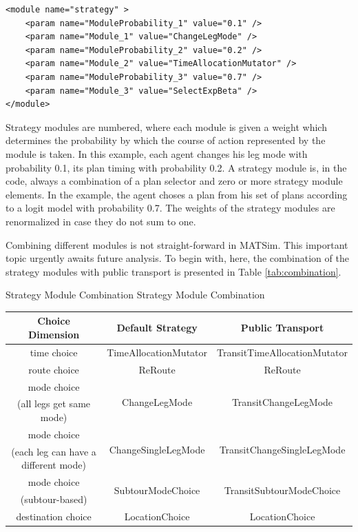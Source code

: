 \begin{lstlisting}
<module name="strategy" >
    <param name="ModuleProbability_1" value="0.1" />
    <param name="Module_1" value="ChangeLegMode" />
    <param name="ModuleProbability_2" value="0.2" />
    <param name="Module_2" value="TimeAllocationMutator" />
    <param name="ModuleProbability_3" value="0.7" />
    <param name="Module_3" value="SelectExpBeta" />
</module>
\end{lstlisting}

Strategy modules are numbered, where each module is given a weight which determines the probability by which the course of action represented by the module is taken. In this example, each agent changes his leg mode with probability 0.1, its plan timing with probability 0.2. A strategy module is, in the code, always a combination of a plan selector and zero or more strategy module elements. In the example, the agent choses a plan from his set of plans according to a logit model with probability 0.7. The weights of the strategy modules are renormalized in case they do not sum to one.

Combining different modules is not straight-forward in MATSim. This important topic urgently awaits future analysis. To begin with, here, the combination of the strategy modules with public transport is presented in Table \ref{tab:combination}.

\createtable%
{Strategy Module Combination}%
{Strategy Module Combination}%
{\label{tab:combination}}%
{%
  \begin{tabular}[c]{|c|c|c|}
   \hline
\textbf{Choice Dimension}	& \textbf{Default Strategy} & \textbf{Public Transport}\\
\hline
time choice & TimeAllocationMutator &  TransitTimeAllocationMutator\\
\hline
route choice & ReRoute & ReRoute \\
\hline
mode choice & \multirow{2}{*}{ChangeLegMode} & \multirow{2}{*}{TransitChangeLegMode} \\
(all legs get same mode) &  &  \\
\hline
mode choice & \multirow{2}{*}{ChangeSingleLegMode} & \multirow{2}{*}{TransitChangeSingleLegMode} \\
(each leg can have a different mode) &  &  \\
\hline
mode choice & \multirow{2}{*}{SubtourModeChoice} & \multirow{2}{*}{TransitSubtourModeChoice} \\
(subtour-based) &  &  \\
\hline
destination choice & LocationChoice & LocationChoice \\
\hline
  \end{tabular}
}%
{}

